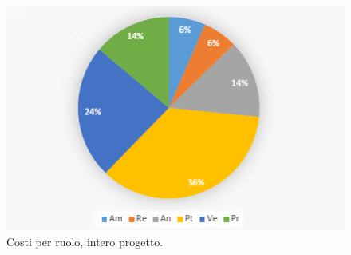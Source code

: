 \documentclass[a4paper]{report}
\begin{document}
				\begin{figure}[H]
					\centering
					\includegraphics[scale=0.7]{PCCostiTotali}
					\caption{Costi per ruolo, intero progetto.}
				\end{figure}
\end{document}
